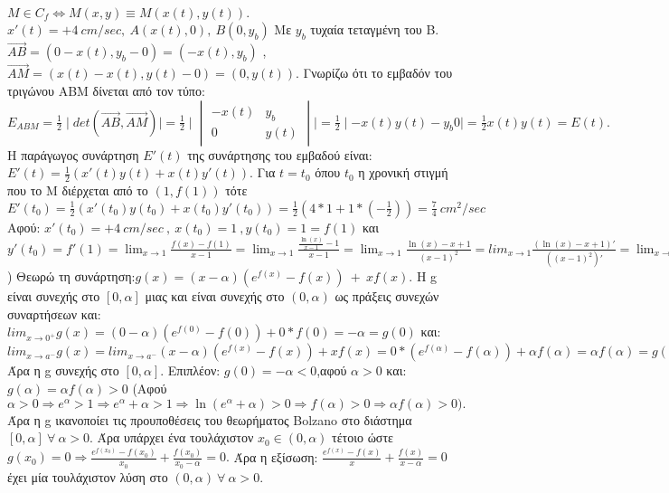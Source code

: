 \documentclass{article}
\begin{document}
$M\in C_f \Leftrightarrow M(x,y)\equiv M(x(t),y(t)).$ \newline
$x'(t)=+4\:cm/sec,\:A(x(t),0),\:B(0,y_b)$ Με $y_b$ τυχαία τεταγμένη του Β.\newline
$\overrightarrow{AB}=(0-x(t),y_b-0)=(-x(t),y_b)$ ,\: $\overrightarrow{AM}=(x(t)-x(t),y(t)-0)=(0,y(t)).$ \newline
Γνωρίζω ότι το εμβαδόν του τριγώνου ΑΒΜ δίνεται από τον τύπο:\newline
$E_{ABM}=\frac{1}{2}\mid det(\overrightarrow{AB},\overrightarrow{AM})\mid=\frac{1}{2}\mid \begin{vmatrix}-x(t) & y_b \\ 0 & y(t) \end{vmatrix}\mid=\frac{1}{2}\mid -x(t)y(t)-y_b0\mid=\frac{1}{2}x(t)y(t)=E(t).$
\newline Η παράγωγος συνάρτηση $E'(t)$ της συνάρτησης του εμβαδού είναι:\newline
$E'(t)=\frac{1}{2}(x'(t)y(t)+x(t)y'(t)).$\newline
Για $t=t_0$ όπου $t_0$ η χρονική στιγμή που το M διέρχεται από το $(1,f(1))$ τότε $E'(t_0)=\frac{1}{2}(x'(t_0)y(t_0)+x(t_0)y'(t_0))=\frac{1}{2}(4*1+1*(-\frac{1}{2}))=\frac{7}{4}\:cm^2/sec$ \newline
Αφού:\: $x'(t_0)=+4\:cm/sec\:,\: x(t_0)=1\:,y(t_0)=1=f(1)$ και $y'(t_0)=f'(1)=\lim_{x\to 1}\frac{f(x)-f(1)}{x-1}=\lim_{x\to 1}\frac{\frac{\ln(x)}{x-1}-1}{x-1}=\lim_{x\to 1}\frac{\ln(x)-x+1}{(x-1)^2}=lim_{x\to 1}\frac{(\ln(x)-x+1)'}{((x-1)^2)'}=\lim_{x\to 1}\frac{\frac{1}{x}-1}{2(x-1)}=\lim_{x\to 1}\frac{(\frac{1}{x}-1)'}{(2(x-1))'}=\lim{x\to 1}\frac{\frac{-1}{x^2}}{2}=\lim_{x\to 1}\frac{-1}{x^2}=\frac{-1}{2}$ \newline
{}) Θεωρώ τη συνάρτηση:$g(x)=(x-\alpha)(e^{f(x)}-f(x)) \:+\:xf(x).$\newline
Η g είναι συνεχής στο $[0,\alpha]$ μιας και είναι συνεχής στο $(0,\alpha) $ ως πράξεις συνεχών συναρτήσεων και:\newline
$lim_{x\to 0^+}g(x)=(0-\alpha)(e^{f(0)}-f(0))+0*f(0)=-\alpha=g(0) $ και: \newline 
$lim_{x\to a^-}g(x)=lim_{x\to a^-}(x-\alpha)(e^{f(x)}-f(x)) +xf(x)=0*(e^{f(\alpha)} -f(\alpha)) +\alpha f(\alpha)=\alpha f(\alpha)=g(\alpha).$ \newline Άρα η g συνεχής στο $[0,\alpha].$ \newline
 Επιπλέον: $g(0)=-\alpha <{0}$\:,αφού $\alpha >0$ \: και: $g(\alpha)=\alpha f(\alpha)>0$ \:(Αφού $\alpha >0 \Rightarrow e^\alpha>1 \Rightarrow e^\alpha + \alpha>1 \Rightarrow \ln(e^\alpha + \alpha)>0\Rightarrow f(\alpha)>0 \Rightarrow \alpha f(\alpha)>0).$ \newline
 Άρα η g ικανοποίει τις προυποθέσεις του θεωρήματος Bolzano στο διάστημα $[0,\alpha]\: \forall\:\alpha>0.$ \newline Άρα υπάρχει ένα τουλάχιστον $x_0 \in (0,\alpha) $ τέτοιο ώστε $g(x_0)=0 \Rightarrow \frac{e^{f(x_0)}-f(x_0)}{x_0} + \frac{f(x_0)}{x_0-\alpha} =0.$ Άρα η εξίσωση: $\frac{e^{f(x)}-f(x)}{x} + \frac{f(x)}{x-\alpha}=0 $ έχει μία τουλάχιστον λύση στο \newline \newline
 $(0,\alpha)\:\forall\:\alpha>0 .$ 
 
\end{document}
